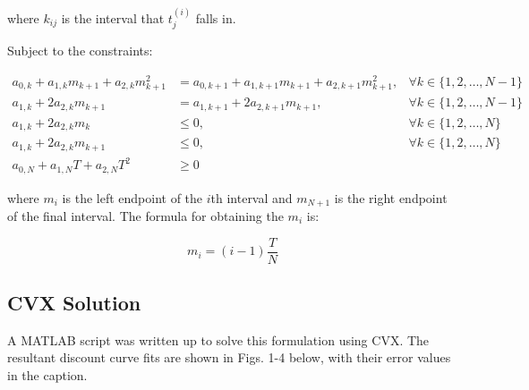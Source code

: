\documentclass[a4paper]{article}
\begin{document}
where $k_{ij}$ is the interval that $t_j^{(i)}$ falls in.

Subject to the constraints:

\begin{equation}
  \begin{aligned}
    a_{0,k} + a_{1,k} m_{k+1} + a_{2,k} m_{k+1}^2
    &=
    a_{0,k+1} + a_{1,k+1} m_{k+1} + a_{2,k+1} m_{k+1}^2
    , &\forall k \in \{1,2,\dots,N-1\}
    \\
    a_{1,k} + 2 a_{2,k} m_{k+1}
    &=
    a_{1,k+1} + 2 a_{2,k+1} m_{k+1}
    , &\forall k \in \{1,2,\dots,N-1\}
    \\
    a_{1,k} + 2 a_{2,k} m_k     &\leq 0 , & \forall k \in \{1,2,\dots,N\}
    \\
    a_{1,k} + 2 a_{2,k} m_{k+1} &\leq 0 , & \forall k \in \{1,2,\dots,N\}
    \\
    a_{0,N} + a_{1,N} T + a_{2,N} T^2 &\geq 0 &
  \end{aligned}
\end{equation}

where $m_i$ is the left endpoint of the $i$th interval and $m_{N+1}$ is the right endpoint of the final interval.
The formula for obtaining the $m_i$ is:

$$
m_i = (i-1) \frac{T}{N}
$$

\subsection{CVX Solution}
A MATLAB script was written up to solve this formulation using CVX.
The resultant discount curve fits are shown in Figs. 1-4 below, with their error values in the caption.
\end{document}
